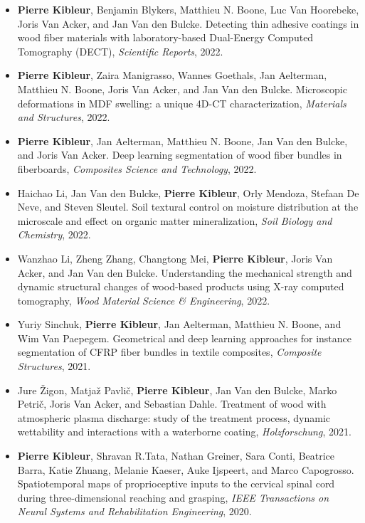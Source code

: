\documentclass[oneside, english, 10pt, a4paper]{memoir}
\begin{document}
\begin{itemize}    	    	
	\item \textbf{Pierre Kibleur}, Benjamin Blykers, Matthieu N. Boone, Luc Van Hoorebeke, Joris Van Acker, and Jan Van den Bulcke. Detecting thin adhesive coatings in wood fiber materials with laboratory-based Dual-Energy Computed Tomography (DECT), \emph{Scientific Reports}, 2022.
	
	\item  {\textbf{Pierre Kibleur}, Zaira Manigrasso, Wannes Goethals, Jan Aelterman, Matthieu N. Boone, Joris Van Acker, and Jan Van den Bulcke}. {Microscopic deformations in MDF swelling: a unique 4D-CT characterization}, \emph{Materials and Structures}, 2022.
		
	\item  {\textbf{Pierre Kibleur}, Jan Aelterman, Matthieu N. Boone, Jan Van den Bulcke, and Joris Van Acker}. {Deep learning segmentation of wood fiber bundles in fiberboards}, \emph{Composites Science and Technology},  2022.
	
	\item Haichao Li, Jan Van den Bulcke, \textbf{Pierre Kibleur}, Orly Mendoza, Stefaan De Neve, and Steven Sleutel. Soil textural control on moisture distribution at the microscale and effect on organic matter mineralization, \emph{Soil Biology and Chemistry}, 2022.
	
	\item {Wanzhao Li, Zheng Zhang, Changtong Mei, \textbf{Pierre Kibleur}, Joris Van Acker, and Jan Van den Bulcke}. {Understanding the mechanical strength and dynamic structural changes of wood-based products using X-ray computed tomography}, \emph{Wood Material Science {\&} Engineering}, 2022.
	
	\item {Yuriy Sinchuk, \textbf{Pierre Kibleur}, Jan Aelterman, Matthieu N. Boone, and Wim Van Paepegem}. {Geometrical and deep learning approaches for instance segmentation of CFRP fiber bundles in textile composites}, \emph{Composite Structures}, 2021.
	
	\item {Jure \v{Z}}igon, Matja{\v{z}} Pavli{\v{c}}, \textbf{Pierre Kibleur}, Jan Van den Bulcke, Marko Petri{\v{c}}, Joris Van Acker, and Sebastian Dahle. {Treatment of wood with atmospheric plasma discharge: study of the treatment process, dynamic wettability and interactions with a waterborne coating}, \emph{{Holzforschung}}, 2021.
	
	\item {\textbf{Pierre Kibleur}, Shravan R.Tata, Nathan Greiner, Sara Conti, Beatrice Barra, Katie Zhuang, Melanie Kaeser, Auke Ijspeert, and Marco Capogrosso}. {Spatiotemporal maps of proprioceptive inputs to the cervical spinal cord during three-dimensional reaching and grasping}, \emph{IEEE Transactions on Neural Systems and Rehabilitation Engineering}, 2020.
	

\end{itemize}
\end{document}
